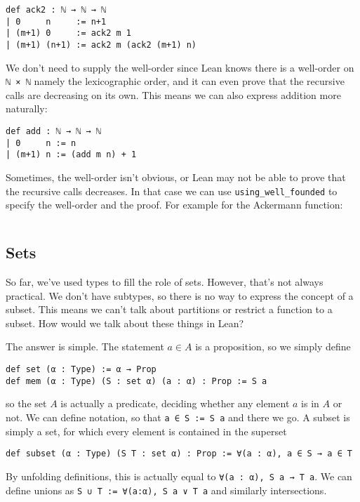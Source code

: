 \documentclass[a4paper, 12pt]{article}
\newcommand{\lean}[1]{\texttt{#1}}
\theoremstyle{changedot}
\theoremstyle{changedotbreak}
\theoremstyle{nonumberplain}
\begin{document}
\begin{verbatim}
def ack2 : ℕ → ℕ → ℕ
| 0     n     := n+1
| (m+1) 0     := ack2 m 1
| (m+1) (n+1) := ack2 m (ack2 (m+1) n)
\end{verbatim}
We don't need to supply the well-order since Lean knows there is a well-order on \lean{ℕ × ℕ} namely the lexicographic order, and it can even prove that the recursive calls are decreasing on its own. This means we can also express addition more naturally:

\begin{verbatim}
def add : ℕ → ℕ → ℕ
| 0     n := n
| (m+1) n := (add m n) + 1
\end{verbatim}

Sometimes, the well-order isn't obvious, or Lean may not be able to prove that the recursive calls decreases. In that case we can use \lean{using_well_founded} to specify the well-order and the proof. For example for the Ackermann function:

\begin{verbatim}

\end{verbatim}

\subsection{Sets}\label{ssec:sets}
So far, we've used types to fill the role of sets. However, that's not always practical. We don't have subtypes, so there is no way to express the concept of a subset. This means we can't talk about partitions or restrict a function to a subset. How would we talk about these things in Lean?

The answer is simple. The statement $a \in A$ is a proposition, so we simply define
\begin{verbatim}
def set (α : Type) := α → Prop
def mem (α : Type) (S : set α) (a : α) : Prop := S a
\end{verbatim}
so the set $A$ is actually a predicate, deciding whether any element $a$ is in $A$ or not. We can define notation, so that \lean{a ∈ S := S a} and there we go. A subset is simply a set, for which every element is contained in the superset
\begin{verbatim}
def subset (α : Type) (S T : set α) : Prop := ∀(a : α), a ∈ S → a ∈ T
\end{verbatim}
By unfolding definitions, this is actually equal to \lean{∀(a : α), S a → T a}. We can define unions as \lean{S ∪ T := ∀(a:α), S a ∨ T a} and similarly intersections.
\end{document}
